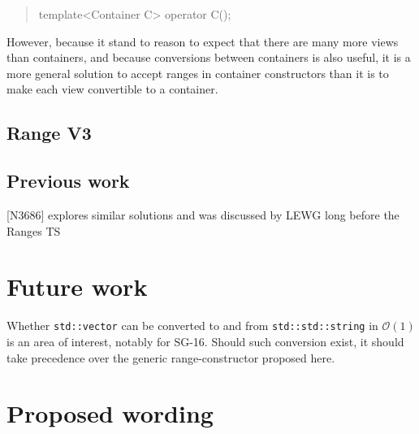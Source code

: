 \documentclass{wg21}
\newcommand{\cc}[1]{\texttt{#1}}
\begin{document}
\begin{quote}
\begin{codeblock}
template<Container C>
operator C();
\end{codeblock}
\end{quote}

However, because it stand to reason to expect that there are many more views than containers, and because conversions between containers is also useful,
it is a more general solution to accept ranges in container constructors than it is to make each view convertible to a container.


\subsection{Range V3}

\subsection{Previous work}

[N3686] explores similar solutions and was discussed by LEWG long before the Ranges TS

\section{Future work}

Whether \cc{std::vector} can be converted to and from \cc{std::std::string} in $\mathcal{O}(1)$ is an area of interest, notably for SG-16.
Should such conversion  exist, it should take precedence over the generic range-constructor proposed here.  

\section{Proposed wording}

\end{document}

